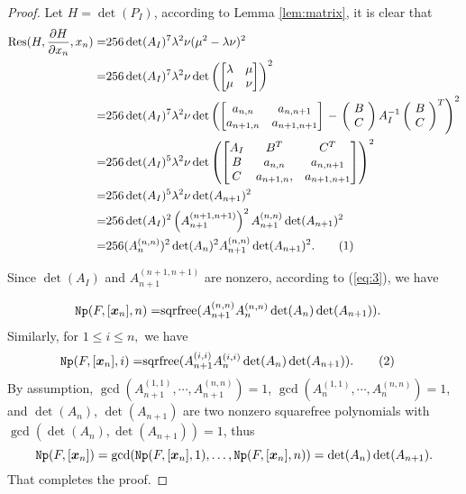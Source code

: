 \documentclass[amsthm]{elsart}
\def \Res  {{\rm Res}}
\def \sqrfree  {{\rm sqrfree}}
\def  \Nproj {{\tt Np}}
\newcommand{\xx}{\bm{x}}
\newcommand\numberthis{\addtocounter{equation}{1}\tag{\theequation}}
\begin{document}
\begin{proof}
  Let $H=\det(P_{I})$, according to Lemma \ref{lem:matrix}, it is clear that
  \begin{align*}
    \Res(H,\frac{\partial H }{\partial x_n }, x_n)=&256\det(A_I)^7\lambda^2\nu(\mu^2-\lambda\nu)^2\\
    =&256 \det(A_I)^7\lambda^2\nu \det\left(\begin{bmatrix} \lambda & \mu \\
        \mu & \nu \end{bmatrix}\right)^2\\
    =& 256 \det(A_I)^7\lambda^2\nu \det \left(\begin{bmatrix} a_{n,n} & a_{n,n+1} \\
        a_{n+1,n} & a_{n+1,n+1}\end{bmatrix}\right. -\left . \left(\! \begin{array}{c}
          B \\
          C
        \end{array}
        \!\right)
      A_I^{-1}\left(\! \begin{array}{c}
          B \\
          C
        \end{array}
        \!\right)^T\right)^2\\
    =& 256 \det(A_I)^5\lambda^2\nu \det\left(\begin{bmatrix} A_I&B^T&C^T\\
        B& a_{n,n}&a_{n,n+1}\\
        C&a_{n+1,n},&a_{n+1,n+1}\end{bmatrix}\right)^2\\
    =&256  \det(A_I)^5\lambda^2\nu  \det(A_{n+1})^2\\
    =& 256 \det(A_I)^2  \left(A_{n+1}^{(n+1,n+1)}\right)^2 A_{n+1}^{(n,n)} \det(A_{n+1})^2 \\
    =& 256 (A_{n}^{(n,n)})^2 \det(A_{n})^2 A_{n+1}^{(n,n)} \det(A_{n+1})^2.\numberthis \label{eq:3}
  \end{align*}

  Since $\det(A_I)$ and $A_{n+1}^{(n+1,n+1)}$ are nonzero, according to (\ref{eq:3}), we have


  \begin{align*}
    \Nproj(F,[\xx_n],n)    =&\sqrfree(A_{n+1}^{(n,n)}A_{n}^{(n,n)}\det(A_{n}) \det(A_{n+1})). \end{align*}
Similarly, for $1\le i\le n,$ we have
  \begin{align*}
    \Nproj(F,[\xx_n],i)=&\sqrfree( A_{n+1}^{(i,i)}A_{n}^{(i,i)}\det(A_{n})\det(A_{n+1})). \numberthis \label{eq:4}
  \end{align*}
By assumption, $\gcd(A_{n+1}^{(1,1)},\cdots, A_{n+1}^{(n,n)})=1$, $\gcd(A_{n}^{(1,1)},\cdots, A_{n}^{(n,n)})=1$, and $\det(A_{n})$, $\det(A_{n+1})$ are two nonzero squarefree polynomials with $\gcd(\det(A_{n}),\det(A_{n+1}))=1$, thus
  $$\Nproj(F,[\xx_n])=\gcd(\Nproj(F,[\xx_n],1 ),\ldots,\Nproj(F,[\xx_n],n))=\det(A_{n})\det(A_{n+1}).$$
  That completes the proof.
\end{proof}
\end{document}
